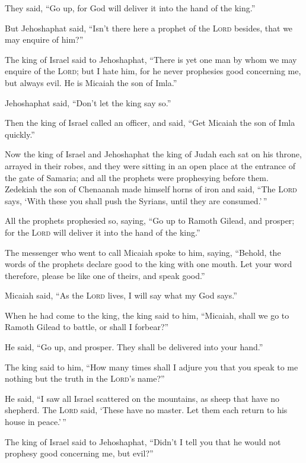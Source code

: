 They said, ``Go up, for God will deliver it into the hand of the king.''

 But Jehoshaphat said, ``Isn't there here a prophet of the
\textsc{Lord} besides, that we may enquire of him?''

 The king of Israel said to Jehoshaphat, ``There is yet
one man by whom we may enquire of the \textsc{Lord}; but I hate him, for
he never prophesies good concerning me, but always evil. He is Micaiah
the son of Imla.''

Jehoshaphat said, ``Don't let the king say so.''

 Then the king of Israel called an officer, and said,
``Get Micaiah the son of Imla quickly.''

 Now the king of Israel and Jehoshaphat the king of Judah
each sat on his throne, arrayed in their robes, and they were sitting in
an open place at the entrance of the gate of Samaria; and all the
prophets were prophesying before them.  Zedekiah the son
of Chenaanah made himself horns of iron and said, ``The \textsc{Lord}
says, `With these you shall push the Syrians, until they are
consumed.'\,''

 All the prophets prophesied so, saying, ``Go up to
Ramoth Gilead, and prosper; for the \textsc{Lord} will deliver it into
the hand of the king.''

 The messenger who went to call Micaiah spoke to him,
saying, ``Behold, the words of the prophets declare good to the king
with one mouth. Let your word therefore, please be like one of theirs,
and speak good.''

 Micaiah said, ``As the \textsc{Lord} lives, I will say
what my God says.''

 When he had come to the king, the king said to him,
``Micaiah, shall we go to Ramoth Gilead to battle, or shall I forbear?''

He said, ``Go up, and prosper. They shall be delivered into your hand.''

 The king said to him, ``How many times shall I adjure
you that you speak to me nothing but the truth in the \textsc{Lord}'s
name?''

 He said, ``I saw all Israel scattered on the mountains,
as sheep that have no shepherd. The \textsc{Lord} said, `These have no
master. Let them each return to his house in peace.'\,''

 The king of Israel said to Jehoshaphat, ``Didn't I tell
you that he would not prophesy good concerning me, but evil?''

